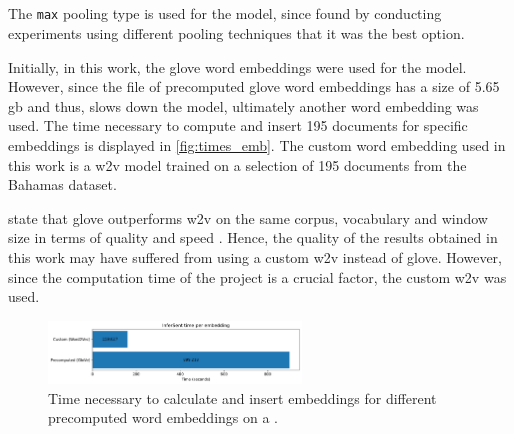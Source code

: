 \subsection*{\infersent{}}\label{subsec:evaluation-inferSent}

The \texttt{max} pooling type is used for the \infersent{} model, since \citeauthor{inferSent2018} 
found by conducting experiments using different pooling techniques that it was the best option.

Initially, in this work, the \ac{glove} word embeddings were used for the \infersent{} model.
However, since the file of precomputed \acs{glove} word embeddings has a size of 5.65 \ac{gb} and thus,
slows down the model, ultimately another word embedding was used.
The time necessary to compute and insert 195 documents for specific embeddings is displayed in \autoref{fig:times_emb}.
The custom word embedding used in this work is a \ac{w2v} model trained on a selection of 195 documents from the Bahamas dataset.

\citeauthor{glove2014} state that \acs{glove} outperforms \ac{w2v} on the same corpus, 
vocabulary and window size in terms of quality and speed \cite{glove2014}.
Hence, the quality of the results obtained in this work may have suffered from using a custom \ac{w2v} instead of \acs{glove}.
However, since the computation time of the project is a crucial factor, the custom \ac{w2v} was used.

\begin{figure}%
    \centering
    \includegraphics[width=0.6\textwidth]{images/embeddings/infersent/InferSent_time_per_embedding.pdf}
    \caption[Times for \infersent{} embeddings per precomputed word embedding]
    {Time necessary to calculate and insert \infersent{} embeddings for different precomputed word embeddings on a \localMaschineStats{}.
    }
    \label{fig:times_emb}%
\end{figure}
